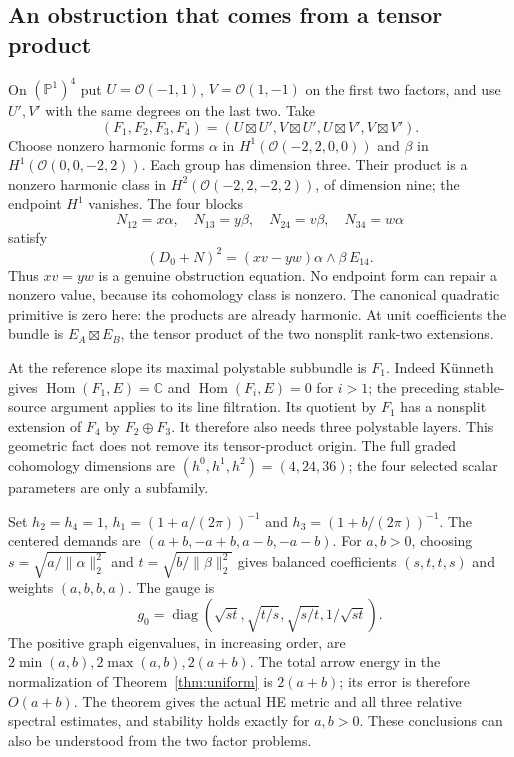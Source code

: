 \documentclass[11pt]{amsart}
\theoremstyle{definition}
\theoremstyle{remark}
\newcommand{\CC}{\mathbb C}
\newcommand{\PP}{\mathbb P}
\newcommand{\cO}{\mathcal O}
\newcommand{\Hom}{\operatorname{Hom}}
\newcommand{\diag}{\operatorname{diag}}
\begin{document}
\subsection{An obstruction that comes from a tensor product}\label{subsec:product}
On $(\PP^1)^4$ put $U=\cO(-1,1)$, $V=\cO(1,-1)$ on the first
two factors, and use $U',V'$ with the same degrees on the last two.
Take
\[
 (F_1,F_2,F_3,F_4)
 =(U\boxtimes U',V\boxtimes U',U\boxtimes V',V\boxtimes V').
\]
Choose nonzero harmonic forms $\alpha$ in
$H^1(\cO(-2,2,0,0))$ and $\beta$ in
$H^1(\cO(0,0,-2,2))$. Each group has dimension three. Their product is
a nonzero harmonic class in $H^2(\cO(-2,2,-2,2))$, of dimension nine;
the endpoint $H^1$ vanishes. The four blocks
\[
 N_{12}=x\alpha,\quad N_{13}=y\beta,\quad
 N_{24}=v\beta,\quad N_{34}=w\alpha
\]
satisfy
\begin{equation}\label{eq:product-obstruction}
 (D_0+N)^2=(xv-yw)\alpha\wedge\beta\,E_{14}.
\end{equation}
Thus $xv=yw$ is a genuine obstruction equation. No endpoint form can
repair a nonzero value, because its cohomology class is nonzero. The
canonical quadratic primitive is zero here: the products are already
harmonic. At unit coefficients the bundle is $E_A\boxtimes E_B$, the
tensor product of the two nonsplit rank-two extensions.

At the reference slope its maximal polystable subbundle is $F_1$.
Indeed K\"unneth gives $\Hom(F_1,E)=\CC$ and $\Hom(F_i,E)=0$ for
$i>1$; the preceding stable-source argument applies to its line filtration.
Its quotient by $F_1$ has a nonsplit extension of $F_4$ by $F_2\oplus F_3$.
It therefore also needs three polystable layers. This geometric fact does
not remove its tensor-product origin. The full graded cohomology dimensions
are $(h^0,h^1,h^2)=(4,24,36)$; the four selected scalar parameters are
only a subfamily.

Set $h_2=h_4=1$, $h_1=(1+a/(2\pi))^{-1}$ and
$h_3=(1+b/(2\pi))^{-1}$. The centered demands are
$(a+b,-a+b,a-b,-a-b)$. For $a,b>0$, choosing
$s=\sqrt{a/\|\alpha\|_2^2}$ and $t=\sqrt{b/\|\beta\|_2^2}$
gives balanced coefficients $(s,t,t,s)$ and weights $(a,b,b,a)$.
The gauge is
\[
 g_0=\diag(\sqrt{st},\sqrt{t/s},\sqrt{s/t},1/\sqrt{st}).
\]
The positive graph eigenvalues, in increasing order, are
$2\min(a,b),2\max(a,b),2(a+b)$. The total arrow energy in the
normalization of Theorem~\ref{thm:uniform} is $2(a+b)$; its error is
therefore $O(a+b)$. The theorem gives the actual HE metric and all three
relative spectral estimates, and stability holds exactly for $a,b>0$.
These conclusions can also be understood from the two factor problems.
\end{document}
